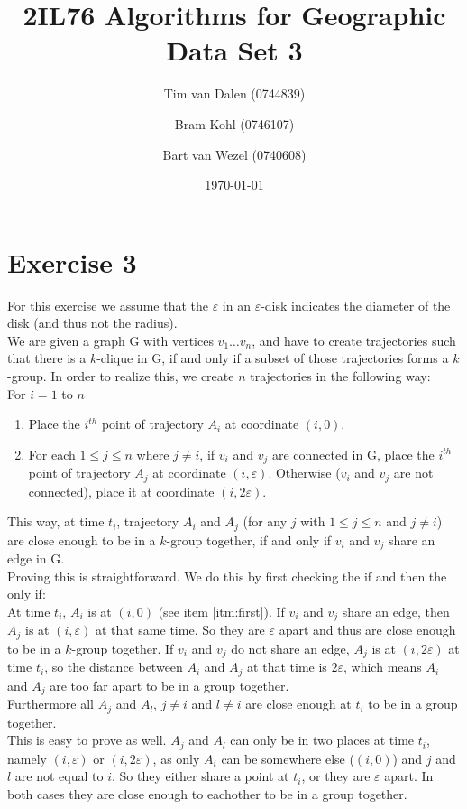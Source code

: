 \documentclass[a4paper,11pt]{article}
\title{
	2IL76 Algorithms for Geographic Data Set 3 \\
}
\author{
	Tim van Dalen (0744839)
	\and
	Bram Kohl (0746107)
	\and
	Bart van Wezel (0740608)
}
\date{\today}
\begin{document}
	\maketitle
	
\section*{Exercise 3}
For this exercise we assume that the $\varepsilon$ in an $\varepsilon$-disk indicates the diameter of the disk (and thus not the radius).\\

We are given a graph G with vertices $v_1 \dots v_n$, and have to create trajectories such that there is a $k$-clique in G, if and only if a subset of those trajectories forms a $k$-group. In order to realize this, we create $n$ trajectories in the following way:\\
For $i = 1$ to $n$ 
\begin{enumerate}
	\item \label{itm:first} Place the $i^{th}$ point of trajectory $A_i$ at coordinate $(i, 0)$.
	\item \label{itm:second} For each $1 \leq j \leq n$ where $j \neq i$, if $v_i$ and $v_j$ are connected in G, place the $i^{th}$ point of trajectory $A_j$ at coordinate $(i,\varepsilon)$. Otherwise ($v_i$ and $v_j$ are not connected), place it at coordinate $(i,2\varepsilon)$.
\end{enumerate}
This way, at time $t_i$, trajectory $A_i$ and $A_j$ (for any $j$ with $1 \leq j \leq n$ and $j \neq i$) are close enough to be in a $k$-group together, if and only if $v_i$ and $v_j$ share an edge in G.\\
Proving this is straightforward. We do this by first checking the if and then the only if:\\ 
At time $t_i$, $A_i$ is at $(i, 0)$ (see item \ref{itm:first}). If $v_i$ and $v_j$ share an edge, then $A_j$ is at $(i,\varepsilon)$ at that same time. So they are $\varepsilon$ apart and thus are close enough to be in a $k$-group together. If $v_i$ and $v_j$ do not share an edge, $A_j$ is at $(i,2\varepsilon)$ at time $t_i$, so the distance between $A_i$ and $A_j$ at that time is $2\varepsilon$, which means $A_i$ and $A_j$ are too far apart to be in a group together.\\

Furthermore all $A_j$ and $A_l$, $j \neq i$ and $l \neq i$ are close enough at $t_i$ to be in a group together.\\
This is easy to prove as well. $A_j$ and $A_l$ can only be in two places at time $t_i$, namely $(i,\varepsilon)$ or $(i,2\varepsilon)$, as only $A_i$ can be somewhere else ($(i,0)$) and $j$ and $l$ are not equal to $i$. So they either share a point at $t_i$, or they are $\varepsilon$ apart. In both cases they are close enough to eachother to be in a group together.\\
\end{document}
